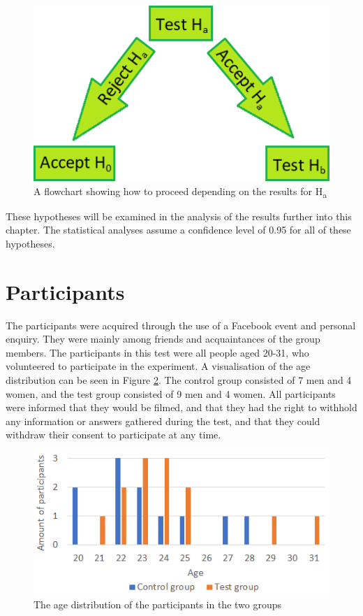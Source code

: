 \begin{figure}[h!]
  \centering
  \includegraphics[scale=0.4]{figures/hypo_flowchart.png}
  \caption{A flowchart showing how to proceed depending on the results for H\textsubscript{a}}\label{fig:hypo_flowchart}
\end{figure}

These hypotheses will be examined in the analysis of the results further into this chapter. The statistical analyses assume a confidence level of 0.95 for all of these hypotheses.

\section{Participants}
The participants were acquired through the use of a Facebook event and personal enquiry. They were mainly among friends and acquaintances of the group members.  
The participants in this test were all people aged 20-31, who volunteered to participate in the experiment. A visualisation of the age distribution can be seen in Figure \ref{fig:age}. The control group consisted of 7 men and 4 women, and the test group consisted of 9 men and 4 women. All participants were informed that they would be filmed, and that they had the right to withhold any information or answers gathered during the test, and that they could withdraw their consent to participate at any time.

\begin{figure}[h!]
  \centering
  \includegraphics[scale=0.7]{figures/agedistribution.png}
  \caption{The age distribution of the participants in the two groups}\label{fig:age}
\end{figure}

